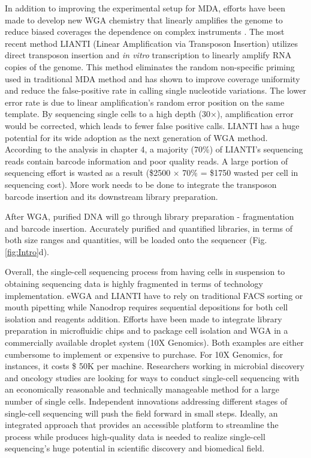 In addition to improving the experimental setup for MDA, efforts have been made to develop new WGA chemistry that linearly amplifies the genome to reduce biased coverages the dependence on complex instruments \cite{Zong:2012bs,Chen:2017hq}. The most recent method LIANTI (Linear Amplification via Transposon Insertion) utilizes direct transposon insertion and \textit{in vitro} transcription to linearly amplify RNA copies of the genome. This method eliminates the random non-specific priming used in traditional MDA method and has shown to improve coverage uniformity and reduce the false-positive rate in calling single nucleotide variations. The lower error rate is due to linear amplification's random error position on the same template. By sequencing single cells to a high depth (30$\times$), amplification error would be corrected, which leads to fewer false positive calls. LIANTI has a huge potential for its wide adoption as the next generation of WGA method. According to the analysis in chapter 4, a majority (70\%) of LIANTI's sequencing reads contain barcode information and poor quality reads. A large portion of sequencing effort is wasted as a result (\$2500 $\times$ 70\% = \$1750 wasted per cell in sequencing cost). More work needs to be done to integrate the transposon barcode insertion and its downstream library preparation.

After WGA, purified DNA will go through library preparation - fragmentation and barcode insertion. Accurately purified and quantified libraries, in terms of both size ranges and quantities, will be loaded onto the sequencer (Fig. \ref{fig:Intro}d). 
 
Overall, the single-cell sequencing process from having cells in suspension to obtaining sequencing data is highly fragmented in terms of technology implementation. eWGA and LIANTI have to rely on traditional FACS sorting or mouth pipetting while Nanodrop requires sequential depositions for both cell isolation and reagents addition. Efforts have been made to integrate library preparation in microfluidic chips \cite{Kim:2017gy} and to package cell isolation and WGA in a commercially available droplet system (10X Genomics). Both examples are either cumbersome to implement or expensive to purchase. For 10X Genomics, for instances, it costs \$ 50K per machine. Researchers working in microbial discovery and oncology studies are looking for ways to conduct single-cell sequencing with an economically reasonable and technically manageable method for a large number of single cells. Independent innovations addressing different stages of single-cell sequencing will push the field forward in small steps. Ideally, an integrated approach that provides an accessible platform to streamline the process while produces high-quality data is needed to realize single-cell sequencing's huge potential in scientific discovery and biomedical field. 

